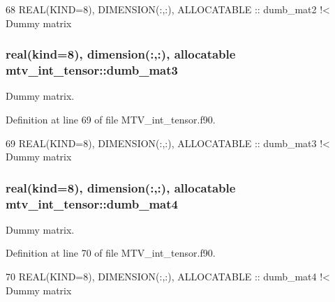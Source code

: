 \begin{DoxyCode}
68   \textcolor{keywordtype}{REAL(KIND=8)}, \textcolor{keywordtype}{DIMENSION(:,:)}, \textcolor{keywordtype}{ALLOCATABLE} :: dumb\_mat2\textcolor{comment}{ !< Dummy matrix}
\end{DoxyCode}
\subsubsection[{\texorpdfstring{dumb\+\_\+mat3}{dumb_mat3}}]{\setlength{\rightskip}{0pt plus 5cm}real(kind=8), dimension(\+:,\+:), allocatable mtv\+\_\+int\+\_\+tensor\+::dumb\+\_\+mat3\hspace{0.3cm}{\ttfamily [private]}}\hypertarget{namespacemtv__int__tensor_a632f7eb0b8cc4e403730d68a985393dd}{}\label{namespacemtv__int__tensor_a632f7eb0b8cc4e403730d68a985393dd}


Dummy matrix. 



Definition at line 69 of file M\+T\+V\+\_\+int\+\_\+tensor.\+f90.


\begin{DoxyCode}
69   \textcolor{keywordtype}{REAL(KIND=8)}, \textcolor{keywordtype}{DIMENSION(:,:)}, \textcolor{keywordtype}{ALLOCATABLE} :: dumb\_mat3\textcolor{comment}{ !< Dummy matrix}
\end{DoxyCode}
\subsubsection[{\texorpdfstring{dumb\+\_\+mat4}{dumb_mat4}}]{\setlength{\rightskip}{0pt plus 5cm}real(kind=8), dimension(\+:,\+:), allocatable mtv\+\_\+int\+\_\+tensor\+::dumb\+\_\+mat4\hspace{0.3cm}{\ttfamily [private]}}\hypertarget{namespacemtv__int__tensor_abb373b53bcba3f369d21fd391e0d72ff}{}\label{namespacemtv__int__tensor_abb373b53bcba3f369d21fd391e0d72ff}


Dummy matrix. 



Definition at line 70 of file M\+T\+V\+\_\+int\+\_\+tensor.\+f90.


\begin{DoxyCode}
70   \textcolor{keywordtype}{REAL(KIND=8)}, \textcolor{keywordtype}{DIMENSION(:,:)}, \textcolor{keywordtype}{ALLOCATABLE} :: dumb\_mat4\textcolor{comment}{ !< Dummy matrix}
\end{DoxyCode}
